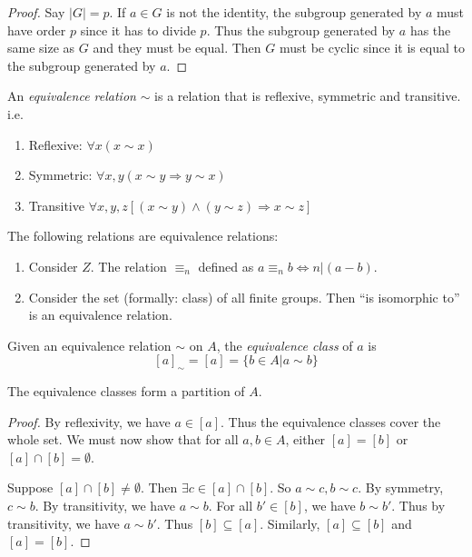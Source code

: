 \documentclass[a4pape]{article}
\begin{document}
\begin{proof}
  Say $|G| = p$. If $a\in G$ is not the identity, the subgroup generated by $a$ must have order $p$ since it has to divide $p$. Thus the subgroup generated by $a$ has the same size as $G$ and they must be equal. Then $G$ must be cyclic since it is equal to the subgroup generated by $a$.
\end{proof}

\begin{defi}
  An \emph{equivalence relation} $\sim$ is a relation that is reflexive, symmetric and transitive. i.e.
  \begin{enumerate}
  \item Reflexive: $\forall x(x\sim x)$
  \item Symmetric: $\forall x, y(x\sim y \Rightarrow y\sim x)$
  \item Transitive $\forall x, y, z[(x\sim y) \wedge (y\sim z)\Rightarrow x\sim z]$
  \end{enumerate}
\end{defi}

\begin{eg}
  The following relations are equivalence relations:
  \begin{enumerate}
  \item Consider $Z$. The relation $\equiv_n$ defined as $a\equiv_n b \Leftrightarrow n | (a - b)$.
  \item Consider the set (formally: class) of all finite groups. Then ``is isomorphic to'' is an equivalence relation.
  \end{enumerate}
\end{eg}

\begin{defi}
  Given an equivalence relation $\sim$ on $A$, the \emph{equivalence class} of $a$ is
  \[
  [a]_{\sim} = [a] = \{b\in A|a\sim b\}
  \]
\end{defi}

\begin{prop}
  The equivalence classes form a partition of $A$.
\end{prop}

\begin{proof}
  By reflexivity, we have $a\in [a]$. Thus the equivalence classes cover the whole set. We must now show that for all $a, b\in A$, either $[a] = [b]$ or $[a]\cap [b]=\emptyset$.

Suppose $[a]\cap[b]\not=\emptyset$. Then $\exists c\in [a]\cap[b]$. So $a\sim c, b\sim c$. By symmetry, $c\sim b$. By transitivity, we have $a\sim b$. For all $b'\in [b]$, we have $b\sim b'$. Thus by transitivity, we have $a\sim b'$. Thus $[b]\subseteq[a]$. Similarly, $[a]\subseteq[b]$  and $[a] = [b]$.
\end{proof}
\end{document}
